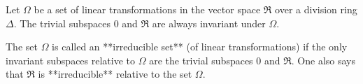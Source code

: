 Let $\Omega$ be a set of linear transformations in the vector space $\Re$ over a division ring $\Delta$. The trivial subspaces $0$ and $\Re$ are always invariant under $\Omega$.

The set $\Omega$ is called an **irreducible set** (of linear transformations) if the only invariant subspaces relative to $\Omega$ are the trivial subspaces $0$ and $\Re$. One also says that $\Re$ is **irreducible** relative to the set $\Omega$.
